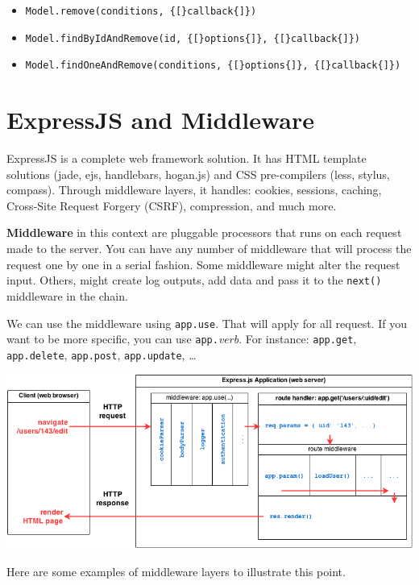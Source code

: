 \documentclass[12pt]{article}
\begin{document}
\begin{itemize}
\item
  \verb!Model.remove(conditions, {[}callback{]})!
\item
  \verb!Model.findByIdAndRemove(id, {[}options{]}, {[}callback{]})!
\item
  \verb!Model.findOneAndRemove(conditions, {[}options{]}, {[}callback{]})!
\end{itemize}

\section{ExpressJS and Middleware}

ExpressJS is a complete web framework solution. It has HTML template
solutions (jade, ejs, handlebars, hogan.js) and CSS pre-compilers (less,
stylus, compass). Through middleware layers, it handles: cookies,
sessions, caching, Cross-Site Request Forgery (CSRF), compression, and much more.

\textbf{Middleware} in this context are pluggable processors that runs on each request
made to the server. You can have any number of middleware that will
process the request one by one in a serial fashion. Some middleware
might alter the request input. Others, might create log outputs, add
data and pass it to the \texttt{next()} middleware in the chain.

We can use the middleware using \texttt{app.use}. That will apply for
all request. If you want to be more specific, you can use
\texttt{app.}\emph{verb}. For instance: \verb!app.get!, \verb!app.delete!, 
\verb!app.post!, \verb!app.update!, \ldots{}

\includegraphics[width=\textwidth]{images/express-middleware}

Here are some examples of middleware layers to illustrate this point.
\end{document}
